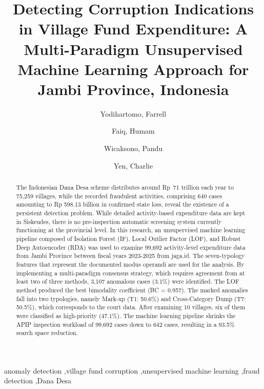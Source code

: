 \documentclass[3p,times,procedia]{elsarticle}
\begin{document}
\begin{frontmatter}


\title{Detecting Corruption Indications in Village Fund Expenditure: A Multi-Paradigm Unsupervised Machine Learning Approach for Jambi Province, Indonesia}

\author[a]{Yodihartomo, Farrell}
\author[b]{Faiq, Humam}
\author[a]{Wicaksono, Pandu}
\author[a]{Yen, Charlie}
\address[a]{Bina Nusantara University}
\address[b]{Komisi Pemberantasan Korupsi}

\begin{abstract}
The Indonesian Dana Desa scheme distributes around Rp~71 trillion each year to 75,259 villages, while the recorded fraudulent activities, comprising 640 cases amounting to Rp 598.13 billion in confirmed state loss, reveal the existence of a persistent detection problem. While detailed activity-based expenditure data are kept in Siskeudes, there is no pre-inspection automatic screening system currently functioning at the provincial level. In this research, an unsupervised machine learning pipeline composed of Isolation Forest (IF), Local Outlier Factor (LOF), and Robust Deep Autoencoder (RDA) was used to examine 99,692 activity-level expenditure data from Jambi Province between fiscal years 2023-2025 from jaga.id. The seven-typology features that represent the documented modus operandi are used for the analysis. By implementing a multi-paradigm consensus strategy, which requires agreement from at least two of three methods, 3,107 anomalous cases (3.1\%) were identified. The LOF method produced the best bimodality coefficient (BC = 0.957). The marked anomalies fall into two typologies, namely Mark-up (T1: 50.6\%) and Cross-Category Dump (T7: 50.5\%), which corresponds to the court data. After examining 10 villages, six of them were classified as high-priority (47.1\%). The machine learning pipeline shrinks the APIP inspection workload of 99,692 cases down to 642 cases, resulting in a 93.5\% search space reduction.
\end{abstract}

\begin{keyword}
anomaly detection \sep village fund corruption \sep unsupervised machine learning \sep fraud detection \sep Dana Desa
\end{keyword}

\end{frontmatter}
\end{document}
